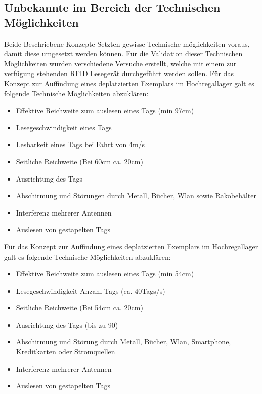 \subsection{Unbekannte im Bereich der Technischen Möglichkeiten}
Beide Beschriebene Konzepte Setzten gewisse Technische möglichkeiten voraus, damit diese umgesetzt werden können. Für die Validation dieser Technischen Möglichkeiten wurden verschiedene Versuche erstellt, welche mit einem zur verfügung stehenden RFID Lesegerät durchgeführt werden sollen.
Für das Konzept zur Auffindung eines deplatzierten Exemplars im Hochregallager galt es folgende Technische Möglichkeiten abzuklären:
\begin{itemize}
	\item Effektive Reichweite zum auslesen eines Tags (min 97cm)
	\item Lesegeschwindigkeit eines Tags
	\item Lesbarkeit eines Tags bei Fahrt von 4m/s
	\item Seitliche Reichweite (Bei 60cm ca. 20cm)
	\item Ausrichtung des Tags
	\item Abschirmung und Störungen durch Metall, Bücher, Wlan sowie Rakobehälter
	\item Interferenz mehrerer Antennen
	\item Auslesen von gestapelten Tags
\end{itemize}
Für das Konzept zur Auffindung eines deplatzierten Exemplars im Hochregallager galt es folgende Technische Möglichkeiten abzuklären:
\begin{itemize}
	\item Effektive Reichweite zum auslesen eines Tags (min 54cm)
	\item Lesegeschwindigkeit Anzahl Tags (ca. 40Tags/s)
	\item Seitliche Reichweite (Bei 54cm ca. 20cm)
	\item Ausrichtung des Tags (bis zu 90\SIUnitSymbolDegree)
	\item Abschirmung und Störung durch Metall, Bücher, Wlan, Smartphone, Kreditkarten oder Stromquellen
	\item Interferenz mehrerer Antennen
	\item Auslesen von gestapelten Tags
\end{itemize}

